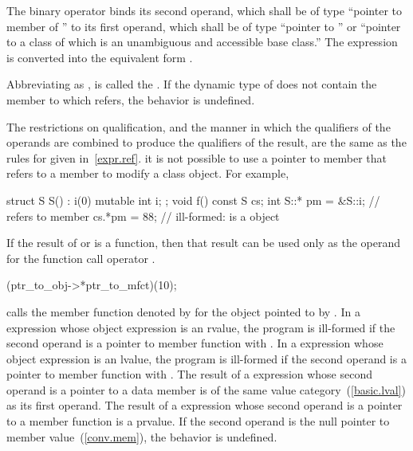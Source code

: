 \pnum
The binary operator \tcode{->*} binds its second operand, which shall be
of type ``pointer to member of '' to its first operand, which shall be of
type ``pointer to '' or ``pointer to a class of which 
is an unambiguous and accessible base class.''
The expression  is converted into the equivalent form
.

\pnum
Abbreviating  as , 
is called the .
If the dynamic type of  does not
contain the member to which
 refers, the behavior is undefined.

\pnum
The restrictions on qualification, and the manner in which
the qualifiers of the operands are combined to produce the
qualifiers of the result, are the same as the rules for
 given in~\ref{expr.ref}.
\enternote 
it is not possible to use a pointer to member that refers to a
 member to modify a  class object. For
example,

\begin{codeblock}
struct S {
  S() : i(0) { }
  mutable int i;
};
void f()
{
const S cs;
int S::* pm = &S::i;            //  refers to  member 
cs.*pm = 88;                    // ill-formed:  is a  object
}
\end{codeblock}
\exitnote 

\pnum
{}%
If the result of  or \tcode{->*} is a function, then that
result can be used only as the operand for the function call operator
\tcode{()}.
\enterexample 

\begin{codeblock}
(ptr_to_obj->*ptr_to_mfct)(10);
\end{codeblock}

calls the member function denoted by  for the object
pointed to by .
\exitexample 
In a  expression whose object expression is an rvalue, the program is
ill-formed if the second operand is a pointer to member function with
 \tcode{\&}.
In a 
expression whose object expression is an lvalue, the program is ill-formed if the second
operand is a pointer to member function with  \tcode{\&\&}.
The result of a  expression
whose second operand is a pointer to a data member is of the same value
category~(\ref{basic.lval}) as its first operand. The result of a  expression whose
second operand is a pointer to a member function is a prvalue.
If the second operand is the null
pointer to member value~(\ref{conv.mem}), the behavior is undefined.

